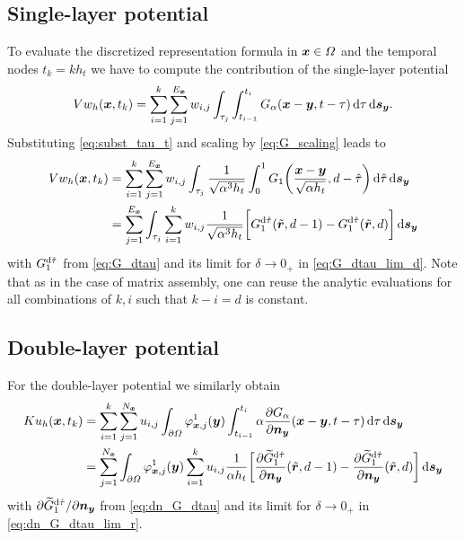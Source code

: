 \documentclass[a4paper,11pt]{article}
\begin{document}
\subsection{Single-layer potential}

To evaluate the discretized representation formula in ${{\bm{x}}}\in\Omega$ and the temporal nodes $t_k = k h_t$ we have to compute the contribution of the single-layer potential
\begin{equation*}
 Vw_h({{\bm{x}}}, t_k) = \sum_{i=1}^{k} \sum_{j=1}^{E_{{\bm{x}}}} w_{i,j} \int_{\tau_j} \int_{t_{i-1}}^{t_i} G_\alpha({{\bm{x}}}-{{\bm{y}}},t-\tau) \,{\mathrm{d}}\tau \,{\mathrm{d}}{{\bm{s}}}_{{\bm{y}}}.
\end{equation*}
Substituting \eqref{eq:subst_tau_t} and scaling by \eqref{eq:G_scaling} leads to
\begin{align*}
  Vw_h({{\bm{x}}}, t_k) &= \sum_{i=1}^{k} \sum_{j=1}^{E_{{\bm{x}}}} w_{i,j} \int_{\tau_j} \frac{1}{\sqrt{\alpha^3 h_t}}\int_0^1 G_1\bigg(\frac{{{\bm{x}}}-{{\bm{y}}}}{\sqrt{\alpha h_t}},d-\hat\tau\bigg) \,{\mathrm{d}}\hat\tau \,{\mathrm{d}}{{\bm{s}}}_{{\bm{y}}} \\
  &= \sum_{j=1}^{E_{{\bm{x}}}} \int_{\tau_j} \sum_{i=1}^{k} w_{i,j} \frac{1}{\sqrt{\alpha^3 h_t}} \bigg[ G_1^{{\mathrm{d}}\hat\tau}(\tilde {{{\bm{r}}}}, d-1) - G_1^{{\mathrm{d}}\hat\tau}(\tilde {{{\bm{r}}}}, d) \bigg] \,{\mathrm{d}}{{\bm{s}}}_{{\bm{y}}}
\end{align*}
with $G_1^{{\mathrm{d}}\hat\tau}$ from \eqref{eq:G_dtau} and its limit for $\delta \to 0_+$ in \eqref{eq:G_dtau_lim_d}. Note that as in the case of matrix assembly, one can reuse the analytic evaluations for all combinations of $k,i$ such that $k-i=d$ is constant.

\subsection{Double-layer potential}

For the double-layer potential we similarly obtain
\begin{align*}
  Ku_h({{\bm{x}}}, t_k) &= \sum_{i=1}^{k} \sum_{j=1}^{N_{{\bm{x}}}} u_{i,j} \int_{\partial\Omega} \varphi^1_{{{\bm{x}}},j}({{\bm{y}}}) \int_{t_{i-1}}^{t_i} \alpha \frac{\partial G_\alpha}{\partial {\ensuremath{{\bm{n}}}}_{{\bm{y}}}}({{\bm{x}}}-{{\bm{y}}},t-\tau) \,{\mathrm{d}}\tau \,{\mathrm{d}}{{\bm{s}}}_{{\bm{y}}} \\
  &= \sum_{j=1}^{N_{{\bm{x}}}} \int_{\partial\Omega} \varphi^1_{{{\bm{x}}},j}({{\bm{y}}}) \sum_{i=1}^{k} u_{i,j} \frac{1}{\alpha h_t} \bigg[ \frac{\partial \widetilde G_1^{{\mathrm{d}}\hat\tau}}{\partial {\ensuremath{{\bm{n}}}}_{{\bm{y}}}}(\tilde {{{\bm{r}}}}, d-1) - \frac{\partial \widetilde G_1^{{\mathrm{d}}\hat\tau}}{\partial {\ensuremath{{\bm{n}}}}_{{\bm{y}}}}(\tilde {{{\bm{r}}}}, d) \bigg] \,{\mathrm{d}}{{\bm{s}}}_{{\bm{y}}}
\end{align*}
with $\partial \widetilde G_1^{{\mathrm{d}}\hat\tau} / \partial {\ensuremath{{\bm{n}}}}_{{\bm{y}}}$ from \eqref{eq:dn_G_dtau} and its limit for $\delta \to 0_+$ in \eqref{eq:dn_G_dtau_lim_r}.

\newpage


\end{document}
